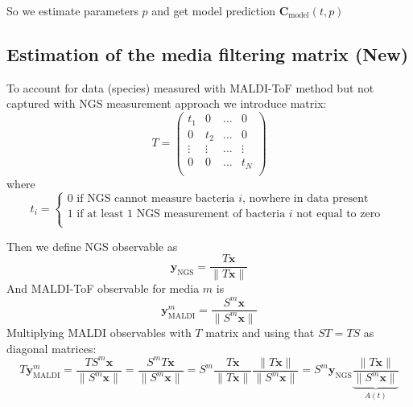 \documentclass[10pt,A4paper]{article}
\begin{document}
So we estimate parameters $p$ and get model prediction $ \mathbf{C}_\text{model} (t, p)$

\subsection{Estimation of the media filtering matrix (New)}
To account for data (species) measured with MALDI-ToF method but not captured with NGS measurement approach we introduce matrix:
\begin{equation}
    T = \begin{pmatrix}
        t_1    & 0      & ... & 0      \\
        0      & t_2    & ... & 0      \\
        \vdots & \vdots & ... & \vdots \\
        0      & 0      & ... & t_N    \\
    \end{pmatrix}
\end{equation}
where
\begin{equation}
    t_i = \begin{cases}
        0 \text{ if NGS cannot measure bacteria $i$, nowhere in data present } \\
        1 \text{ if at least 1 NGS measurement of bacteria $i$ not equal to zero } \\
    \end{cases}
\end{equation}

Then we define NGS observable as
\begin{equation}
    \mathbf{y}_\text{NGS} = \frac{T \mathbf{x}}{\lVert T \mathbf{x} \rVert}
\end{equation}
And MALDI-ToF observable for media $m$ is
\begin{equation}
    \mathbf{y}^m_\text{MALDI} = \frac{S^m \mathbf{x}}{\lVert S^m \mathbf{x} \rVert}
\end{equation}
Multiplying MALDI observables with $T$ matrix and using that $ST=TS$ as diagonal matrices:
\begin{equation}
    T \mathbf{y}^m_\text{MALDI} = \frac{TS^m \mathbf{x}}{\lVert S^m \mathbf{x} \rVert} = \frac{S^m T \mathbf{x}}{\lVert S^m \mathbf{x} \rVert} =
    S^m \frac{T \mathbf{x}}{\lVert T \mathbf{x} \rVert} \frac{\lVert T \mathbf{x} \rVert}{\lVert S^m \mathbf{x} \rVert} = S^m \mathbf{y}_\text{NGS} \underbrace{\frac{\lVert T \mathbf{x} \rVert}{\lVert S^m \mathbf{x} \rVert}}_{A(t)}
\end{equation}
\end{document}
